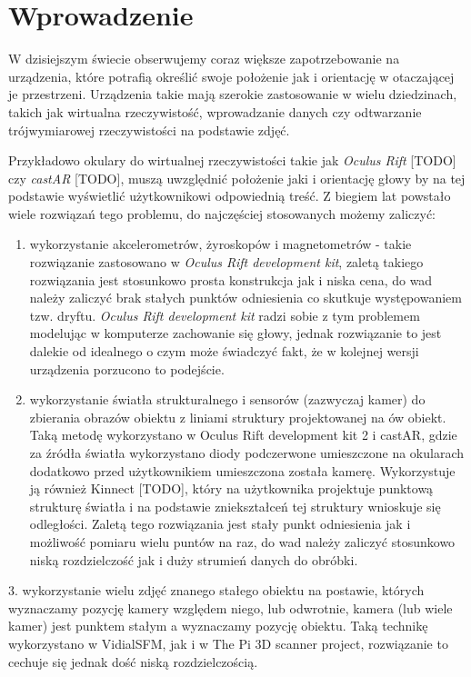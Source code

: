 
\chapter*{Wprowadzenie}

W dzisiejszym świecie obserwujemy coraz większe zapotrzebowanie na urządzenia,
które potrafią określić swoje położenie jak i orientację w otaczającej je przestrzeni.
Urządzenia takie mają szerokie zastosowanie w wielu dziedzinach, takich jak
wirtualna rzeczywistość, wprowadzanie danych czy odtwarzanie trójwymiarowej rzeczywistości na podstawie zdjęć.


Przykładowo okulary do wirtualnej rzeczywistości takie jak \textit{Oculus Rift} [TODO] czy \textit{castAR} [TODO],
muszą uwzględnić położenie jaki i orientację głowy by na tej podstawie wyświetlić użytkownikowi 
odpowiednią treść. 
Z biegiem lat powstało wiele rozwiązań tego problemu, do najczęściej stosowanych możemy zaliczyć:
\begin{enumerate}
 \item 
 wykorzystanie akcelerometrów, żyroskopów i magnetometrów - 
takie rozwiązanie zastosowano w \textit{Oculus Rift development kit}, zaletą takiego rozwiązania jest stosunkowo
prosta konstrukcja jak i niska cena,
do wad należy zaliczyć brak stałych punktów odniesienia co skutkuje występowaniem tzw. dryftu.
\textit{Oculus Rift development kit} radzi sobie z tym problemem modelując w komputerze zachowanie się głowy,
jednak rozwiązanie to jest dalekie od idealnego o czym może świadczyć fakt, że w kolejnej wersji 
urządzenia porzucono to podejście.

\item
 wykorzystanie światła strukturalnego i sensorów (zazwyczaj kamer)
 do zbierania obrazów obiektu z liniami struktury projektowanej na ów obiekt. Taką metodę wykorzystano w 
 Oculus Rift development kit 2 i castAR, gdzie za źródła światła wykorzystano diody podczerwone umieszczone 
 na okularach dodatkowo przed użytkownikiem umieszczona została kamerę. Wykorzystuje ją również Kinnect [TODO],
który na użytkownika projektuje punktową strukturę światła i na podstawie zniekształceń tej struktury wnioskuje 
 się odległości. Zaletą tego rozwiązania jest stały punkt odniesienia jak i możliwość pomiaru wielu puntów na raz,
 do wad należy zaliczyć stosunkowo niską rozdzielczość jak i duży strumień danych do obróbki.

\end{enumerate}


3. wykorzystanie wielu zdjęć znanego stałego obiektu na postawie, których wyznaczamy pozycję kamery względem niego,
  lub odwrotnie, kamera (lub wiele kamer) jest punktem stałym a wyznaczamy pozycję obiektu.  
 Taką technikę wykorzystano w VidialSFM, jak i w The Pi 3D scanner project, 
 rozwiązanie to cechuje się jednak dość niską rozdzielczością.
 

